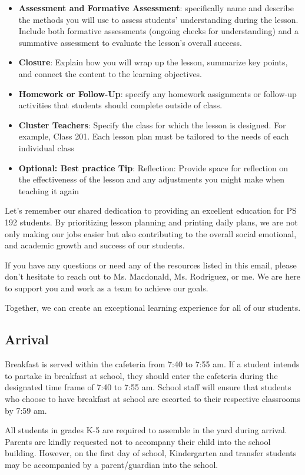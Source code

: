 \documentclass[11pt, letterpaper]{article}
\begin{document}
\begin{itemize}
\begin{itemize}
\end{itemize}
\item \textbf{Assessment and Formative Assessment}: specifically name and describe the methods you will use to assess students' understanding during the lesson. Include both formative assessments (ongoing checks for understanding) and a summative assessment to evaluate the lesson's overall success.
\item \textbf{Closure}: Explain how you will wrap up the lesson, summarize key points, and connect the content to the learning objectives.
\item \textbf{Homework or Follow-Up}: specify any homework assignments or follow-up activities that students should complete outside of class.
\item \textbf{Cluster Teachers}: Specify the class for which the lesson is designed. For example, Class 201. Each lesson plan must be tailored to the needs of each individual class
\item \textbf{Optional: Best practice Tip}: Reflection: Provide space for reflection on the effectiveness of the lesson and any adjustments you might make when teaching it again
\end{itemize}
 Let's remember our shared dedication to providing an excellent education for PS 192 students. By prioritizing lesson planning and printing daily plans, we are not only making our jobs easier but also contributing to the overall social emotional, and academic growth and success of our students.

If you have any questions or need any of the resources listed in this email, please don't hesitate to reach out to Ms. Macdonald, Ms. Rodriguez, or me. We are here to support you and work as a team to achieve our goals.

Together, we can create an exceptional learning experience for all of our students.

\subsection{Arrival} 
Breakfast is served within the cafeteria from 7:40 to 7:55 am. If a student intends to partake in breakfast at school, they should enter the cafeteria during the designated time frame of 7:40 to 7:55 am. School staff will ensure that students who choose to have breakfast at school are escorted to their respective classrooms by 7:59 am.

All students in grades K-5 are required to assemble in the yard during arrival. Parents are kindly requested not to accompany their child into the school building. However, on the first day of school, Kindergarten and transfer students may be accompanied by a parent/guardian into the school.
\end{document}
